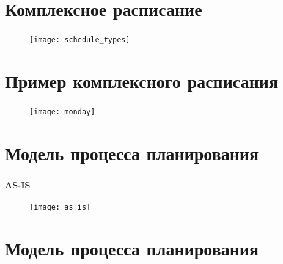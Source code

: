 
\section{Комплексное расписание}

\begin{frame}
\frametitle{\insertsection}

\begin{figure}
    \center
    \texttt{[image: schedule\_types]}
\end{figure}
\end{frame}


\section{Пример комплексного расписания}

\begin{frame}
\frametitle{\insertsection}

\begin{figure}
    \center
    \texttt{[image: monday]}
\end{figure}
\end{frame}


\section{Модель процесса планирования}

\begin{frame}
\frametitle{\insertsection}
\framesubtitle{AS-IS}

\begin{figure}
    \center
    \texttt{[image: as\_is]}
\end{figure}
\end{frame}


\section{Модель процесса планирования}

